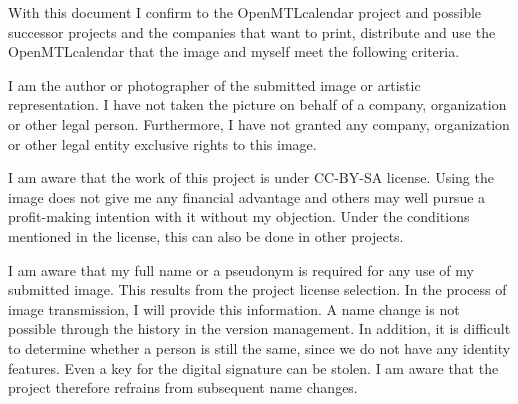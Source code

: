 \documentclass[parskip=half]{scrreprt}
\begin{document}
 
With this document I confirm to the OpenMTLcalendar project and possible successor projects and the companies that want to print, distribute and use the OpenMTLcalendar that the image and myself meet the following criteria.
\begin{contract}
	I am the author or photographer of the submitted image or artistic representation. I have not taken the picture on behalf of a company, organization or other legal person. Furthermore, I have not granted any company, organization or other legal entity exclusive rights to this image.
	
	I am aware that the work of this project is under CC-BY-SA license. Using the image does not give me any financial advantage and others may well pursue a profit-making intention with it without my objection. Under the conditions mentioned in the license, this can also be done in other projects.
	
	I am aware that my full name or a pseudonym is required for any use of my submitted image. This results from the project license selection. In the process of image transmission, I will provide this information. A name change is not possible through the history in the version management. In addition, it is difficult to determine whether a person is still the same, since we do not have any identity features. Even a key for the digital signature can be stolen. I am aware that the project therefore refrains from subsequent name changes.
\end{contract}
\end{document}
